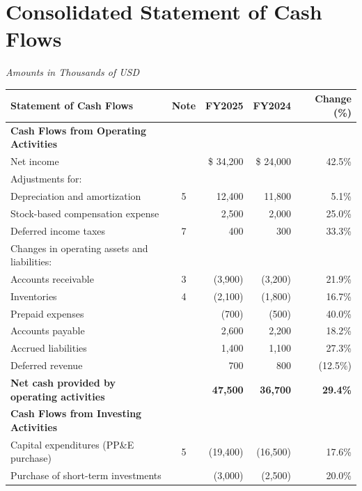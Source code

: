 \section*{Consolidated Statement of Cash Flows}
\begin{center}
  \small\textit{Amounts in Thousands of USD}
\end{center}
\vspace{10pt}

\noindent
\begin{tabularx}{\textwidth}{L c R R R}
  \textbf{Statement of Cash Flows} & \textbf{Note} & \textbf{FY2025} & \textbf{FY2024} & \textbf{Change (\%)} \\
  \midrule
  \textbf{Cash Flows from Operating Activities} & & & & \\
  \quad Net income & & \$ 34,200 & \$ 24,000 & 42.5\% \\
  \quad Adjustments for: & & & & \\
  \qquad Depreciation and amortization & 5 & 12,400 & 11,800 & 5.1\% \\
  \qquad Stock-based compensation expense & & 2,500 & 2,000 & 25.0\% \\
  \qquad Deferred income taxes & 7 & 400 & 300 & 33.3\% \\
  \quad Changes in operating assets and liabilities: & & & & \\
  \qquad Accounts receivable & 3 & (3,900) & (3,200) & 21.9\% \\
  \qquad Inventories & 4 & (2,100) & (1,800) & 16.7\% \\
  \qquad Prepaid expenses & & (700) & (500) & 40.0\% \\
  \qquad Accounts payable & & 2,600 & 2,200 & 18.2\% \\
  \qquad Accrued liabilities & & 1,400 & 1,100 & 27.3\% \\
  \qquad Deferred revenue & & 700 & 800 & (12.5\%) \\
  \textbf{Net cash provided by operating activities} & & \textbf{47,500} & \textbf{36,700} & \textbf{29.4\%} \\
  \midrule
  \textbf{Cash Flows from Investing Activities} & & & & \\
  \quad Capital expenditures (PP\&E purchase) & 5 & (19,400) & (16,500) & 17.6\% \\
  \quad Purchase of short-term investments & & (3,000) & (2,500) & 20.0\% \\

\end{tabularx}
